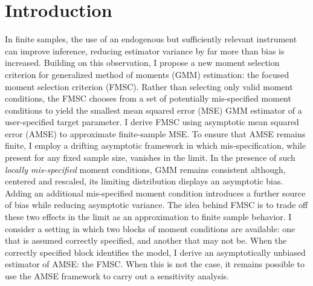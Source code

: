 \section{Introduction}
In finite samples, the use of an endogenous but sufficiently relevant instrument can improve inference, reducing estimator variance by far more than bias is increased. 
Building on this observation, I propose a new moment selection criterion for generalized method of moments (GMM) estimation: the focused moment selection criterion (FMSC). 
Rather than selecting only valid moment conditions, the FMSC chooses from a set of potentially mis-specified moment conditions to yield the smallest mean squared error (MSE) GMM estimator of a user-specified target parameter. 
I derive FMSC using asymptotic mean squared error (AMSE) to approximate finite-sample MSE. To ensure that AMSE remains finite, I employ a drifting asymptotic framework in which mis-specification, while present for any fixed sample size, vanishes in the limit. 
In the presence of such \emph{locally mis-specified} moment conditions, GMM remains consistent although, centered and rescaled, its limiting distribution displays an asymptotic bias. Adding an additional mis-specified moment condition introduces a further source of bias while reducing asymptotic variance. 
The idea behind FMSC is to trade off these two effects in the limit as an approximation to finite sample behavior. 
I consider a setting in which two blocks of moment conditions are available: one that is assumed correctly specified, and another that may not be.
When the correctly specified block identifies the model, I derive an asymptotically unbiased estimator of AMSE: the FMSC. When this is not the case, it remains possible to use the AMSE framework to carry out a sensitivity analysis. 

